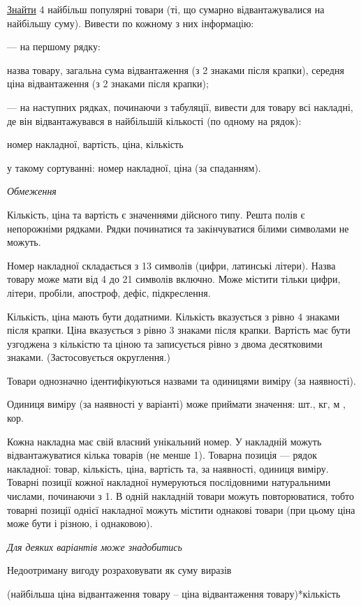 \documentclass[11pt, ukrainian]{article}
\begin{document}
\underline{Знайти} 4 найбільш популярні товари (ті, що сумарно відвантажувалися на найбільшу суму). Вивести по кожному з них інформацію:\par
{\noindent}--- на першому рядку:\par
назва товару, загальна сума відвантаження (з 2 знаками після крапки), середня ціна відвантаження (з 2 знаками після крапки);

{\noindent}--- на наступних рядках, починаючи з табуляції, вивести для товару всі накладні, де він відвантажувався в найбільшій кількості (по одному на рядок):\par
номер накладної, вартість, ціна, кількість

{\noindent}у такому сортуванні: номер накладної, ціна (за спаданням).


\bigskip\textit{Обмеження}

Кількість, ціна та вартість є значеннями дійсного типу.
Решта полів є непорожніми рядками.
Рядки починатися та закінчуватися білими символами не можуть.

Номер накладної складається з 13 символів (цифри, латинські літери).
Назва товару може мати від 4 до 21 символів включно.
Може містити тільки цифри, літери, пробіли, апостроф, дефіс, підкреслення.

Кількість, ціна мають бути додатними.
Кількість вказується з рівно 4 знаками після крапки.
Ціна вказується з рівно 3 знаками після крапки.
Вартість має бути узгоджена з кількістю та ціною та записується рівно з двома десятковими знаками.
(Застосовується округлення.)

Товари однозначно ідентифікуються назвами та одиницями виміру (за наявності).

Одиниця виміру (за наявності у варіанті) може приймати значення: шт., кг, м , кор.

Кожна накладна має свій власний унікальний номер.
У накладній можуть відвантажуватися кілька товарів (не менше 1).
Товарна позиція --- рядок накладної: товар, кількість, ціна, вартість та, за наявності, одиниця виміру.
Товарні позиції кожної накладної нумеруються послідовними натуральними числами, починаючи з 1.
В одній накладній товари можуть повторюватися, 
тобто товарні позиції однієї накладної можуть містити однакові товари 
(при цьому ціна може бути і різною, і однаковою).

\bigskip\textit{Для деяких варіантів може знадобитись}

Недоотриману вигоду розраховувати як суму виразів
{\center (найбільша ціна відвантаження товару – ціна відвантаження товару)*кількість\par}
\end{document}
